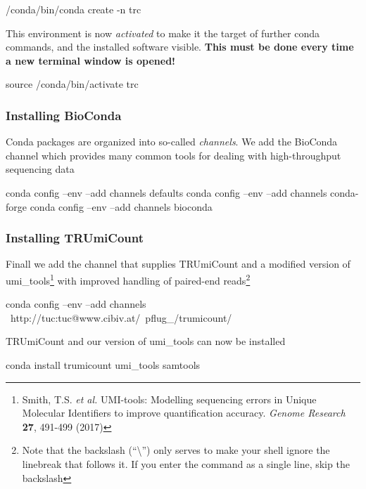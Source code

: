 \documentclass[10pt]{article}
\begin{document}
\begin{shellcode}
/conda/bin/conda create -n trc
\end{shellcode}

This environment is now \emph{activated} to make it the target of further conda commands, and the installed software visible. \textbf{This must be done every time a new terminal window is opened!}

\begin{shellcode}
source /conda/bin/activate trc
\end{shellcode}
\subsubsection*{Installing BioConda}

Conda packages are organized into so-called \emph{channels}. We add the BioConda channel which provides many common tools for dealing with high-throughput sequencing data

\begin{shellcode}
conda config --env --add channels defaults
conda config --env --add channels conda-forge
conda config --env --add channels bioconda
\end{shellcode}

\subsubsection*{Installing TRUmiCount}

Finall we add the channel that supplies TRUmiCount and a modified version of umi\_tools\footnote{Smith, T.S. \textit{et al.} UMI-tools: Modelling sequencing errors in Unique Molecular Identifiers to improve quantification accuracy. \textit{Genome Research} \textbf{27}, 491-499 (2017)} with improved handling of paired-end reads\footnote{Note that the backslash (``\textbackslash'') only serves to make your shell ignore the linebreak that follows it. If you enter the command as a single line, skip the backslash}

\begin{shellcode}
conda config --env --add channels \
  http://tuc:tuc@www.cibiv.at/~pflug_/trumicount/
\end{shellcode}

TRUmiCount and our version of umi\_tools can now be installed

\begin{shellcode}
conda install trumicount umi_tools samtools
\end{shellcode}
\end{document}
